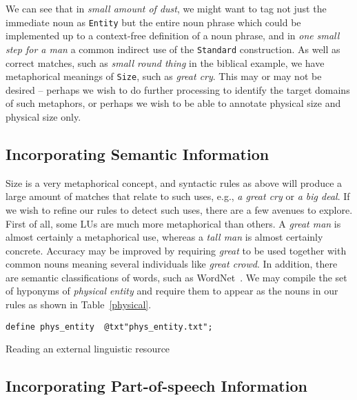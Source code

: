 \documentclass{llncs}
\begin{document}
\noindent We can see that in \emph{small amount of dust}, we might want to
tag not just the immediate noun as \verb+Entity+ but the entire noun phrase
which could be implemented up to a context-free definition of a noun phrase,
and in \emph{one small step for a man} a common indirect use of the \verb+Standard+
construction. As well as correct matches, such as \emph{small round thing} in the biblical
example, we have metaphorical meanings of \verb+Size+, such as \emph{great cry}.
This may or may not be desired -- perhaps we wish to do further processing to
identify the target domains of such metaphors, or perhaps we wish to be able
to annotate physical size and physical size only.

\subsection{Incorporating Semantic Information}

Size is a very metaphorical concept, and syntactic rules as above will produce a large amount of matches that relate to such uses, e.g., \emph{a great cry} or \emph{a big deal}. If we wish to refine our rules to detect such uses, there are a few avenues to explore. First of all, some LUs are much more metaphorical than others. A \emph{great man} is almost certainly a metaphorical use, whereas a \emph{tall man} is almost certainly concrete. Accuracy may be improved by requiring \emph{great} to be used together with common nouns meaning several individuals like \emph{great crowd}. In addition, there are semantic classifications of words, such as WordNet~\cite{wordnet}. We may compile the set of hyponyms of \emph{physical entity} and require them to appear as the nouns in our rules as shown in Table~\ref{physical}.

\begin{table}[h]
\begin{center}
\small
\begin{framed}
\begin{verbatim}
define phys_entity  @txt"phys_entity.txt";
\end{verbatim}
\end{framed}
\end{center}
\normalsize
\caption{Reading an external linguistic resource}
  \label{physical}
\end{table}

\subsection{Incorporating Part-of-speech Information}
\end{document}
